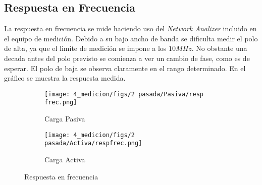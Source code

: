 \subsection{Respuesta en Frecuencia}

La respuesta en frecuencia se mide haciendo uso del \textit{Network Analizer} incluido en el equipo de medición. Debido a su bajo ancho de banda se dificulta medir el polo de alta, ya que el limite de medición se impone a los $10 MHz$. No obstante una decada antes del polo previsto se comienza a ver un cambio de fase, como es de esperar.
El polo de baja se observa claramente en el rango determinado. En el gráfico \label{fig:resp frec polo} se muestra la respuesta medida.

\begin{figure}[ht]
    \begin{subfigure}{.45\textwidth}
      \centering
      \texttt{[image: 4\_medicion/figs/2 pasada/Pasiva/resp frec.png]}  
      \caption{Carga Pasiva}
      \label{fig:frec carga pasiva}
    \end{subfigure}
    \begin{subfigure}{.45\textwidth}
      \centering
      \texttt{[image: 4\_medicion/figs/2 pasada/Activa/respfrec.png]}  
      \caption{Carga Activa}
      \label{fig:frec carga activa}
    \end{subfigure}
    \caption{Respuesta en frecuencia}
    \label{fig:resp frec oscilo}
    \end{figure}




